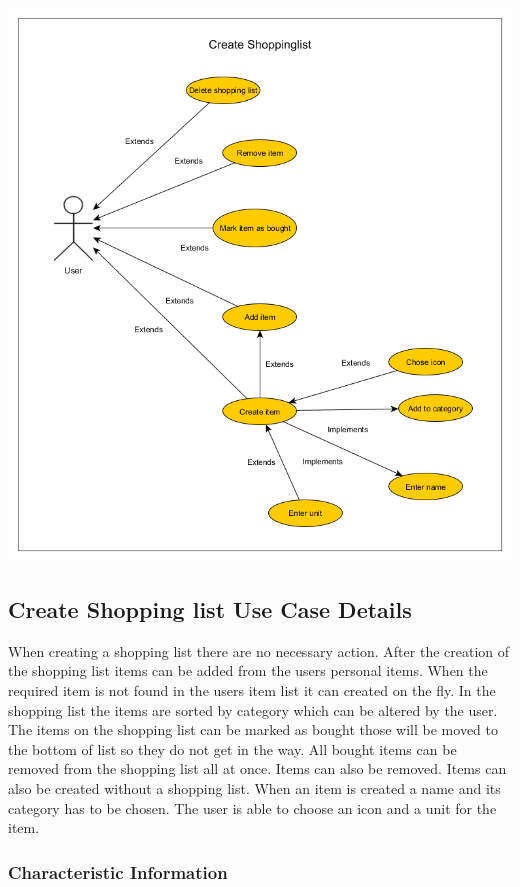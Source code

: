 \documentclass[12pt]{article}
\theoremstyle{definition}
\begin{document}
\includegraphics[scale=.5]{UseCaseCreateShoppinglist.png}\\

\subsection{Create Shopping list Use Case Details}

When creating a shopping list there are no necessary action. After the creation of the shopping list items can be added from the users personal items. When the required item is not found in the users item list it can created on the fly. In the shopping list the items are sorted by category which can be altered by the user. The items on the shopping list can be marked as bought those will be moved to the bottom of list so they do not get in the way. All bought items can be removed from the shopping list all at once. Items can also be removed. Items can also be created without a shopping list. When an item is created a name and its category has to be chosen. The user is able to choose an icon and a unit for the item.
\pagebreak
\subsubsection{Characteristic Information}
\end{document}
